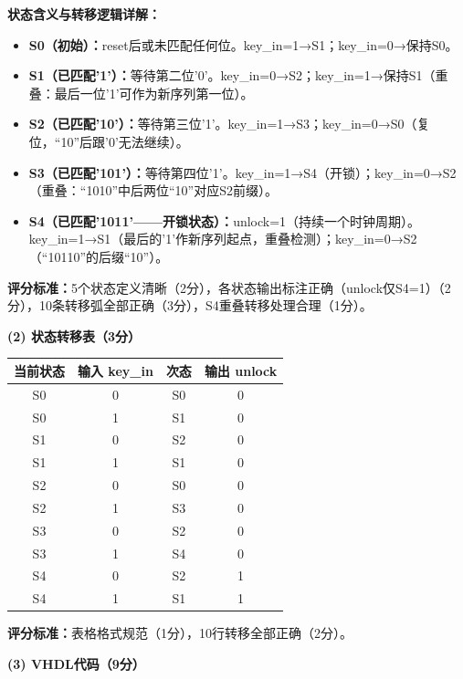 \textbf{状态含义与转移逻辑详解：}
\begin{itemize}
  \item \textbf{S0（初始）：}reset后或未匹配任何位。key\_in=1→S1；key\_in=0→保持S0。
  \item \textbf{S1（已匹配'1'）：}等待第二位'0'。key\_in=0→S2；key\_in=1→保持S1（重叠：最后一位'1'可作为新序列第一位）。
  \item \textbf{S2（已匹配'10'）：}等待第三位'1'。key\_in=1→S3；key\_in=0→S0（复位，“10”后跟'0'无法继续）。
  \item \textbf{S3（已匹配'101'）：}等待第四位'1'。key\_in=1→S4（开锁）；key\_in=0→S2（重叠：“1010”中后两位“10”对应S2前缀）。
  \item \textbf{S4（已匹配'1011'——开锁状态）：}unlock=1（持续一个时钟周期）。key\_in=1→S1（最后的'1'作新序列起点，重叠检测）；key\_in=0→S2（“10110”的后缀“10”）。
\end{itemize}

\textbf{评分标准：}5个状态定义清晰（2分），各状态输出标注正确（unlock仅S4=1）（2分），10条转移弧全部正确（3分），S4重叠转移处理合理（1分）。

\vspace{0.3cm}

\textbf{(2) 状态转移表（3分）}

\begin{center}
\begin{tabular}{|c|c|c|c|}
\hline
\textbf{当前状态} & \textbf{输入 key\_in} & \textbf{次态} & \textbf{输出 unlock} \\
\hline
S0 & 0 & S0 & 0 \\
S0 & 1 & S1 & 0 \\
\hline
S1 & 0 & S2 & 0 \\
S1 & 1 & S1 & 0 \\
\hline
S2 & 0 & S0 & 0 \\
S2 & 1 & S3 & 0 \\
\hline
S3 & 0 & S2 & 0 \\
S3 & 1 & S4 & 0 \\
\hline
S4 & 0 & S2 & 1 \\
S4 & 1 & S1 & 1 \\
\hline
\end{tabular}
\end{center}

\textbf{评分标准：}表格格式规范（1分），10行转移全部正确（2分）。

\vspace{0.3cm}

\textbf{(3) VHDL代码（9分）}

